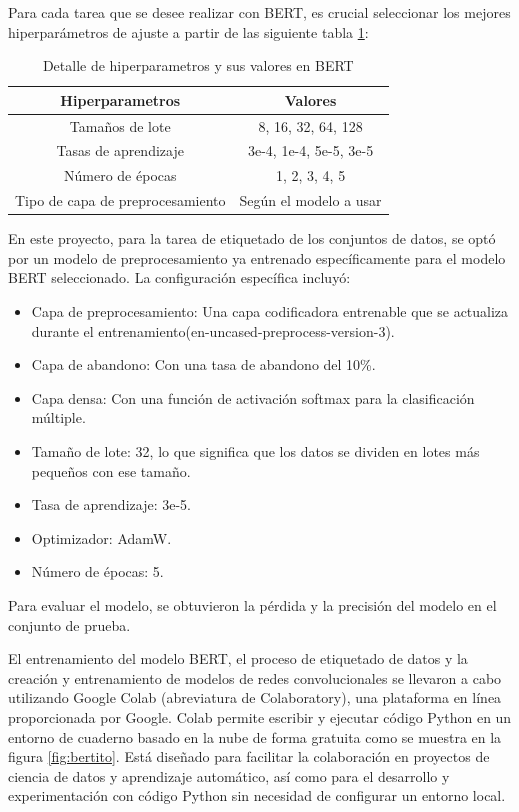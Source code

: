 Para cada tarea que se desee realizar con BERT, es crucial seleccionar los mejores hiperparámetros de ajuste a partir de las siguiente tabla \ref{tbl:2}:

\begin{table}[!ht]
	\centering
	\begin{tabular}{|c|c|}
		\hline
		\textbf{Hiperparametros} & \textbf{Valores} \\ \hline
		Tamaños de lote & 8, 16, 32, 64, 128 \\ \hline
		Tasas de aprendizaje & 3e-4, 1e-4, 5e-5, 3e-5 \\ \hline
		Número de épocas &  1, 2, 3, 4, 5 \\ \hline
		Tipo de capa de preprocesamiento & Según el modelo a usar \\ \hline
	\end{tabular}
	\caption{Detalle de hiperparametros y sus valores en BERT}
	\label{tbl:2}
\end{table}

En este proyecto, para la tarea de etiquetado de los conjuntos de datos, se optó por un modelo de preprocesamiento ya entrenado específicamente para el modelo BERT seleccionado. La configuración específica incluyó:

\begin{itemize}

\item Capa de preprocesamiento: Una capa codificadora entrenable que se actualiza durante el entrenamiento(en-uncased-preprocess-version-3).
\item Capa de abandono: Con una tasa de abandono del 10\%.
\item Capa densa: Con una función de activación softmax para la clasificación múltiple.
\item Tamaño de lote: 32, lo que significa que los datos se dividen en lotes más pequeños con ese tamaño.
\item Tasa de aprendizaje: 3e-5.
\item Optimizador: AdamW.
\item Número de épocas: 5.

\end{itemize}

Para evaluar el modelo, se obtuvieron la pérdida y la precisión del modelo en el conjunto de prueba.

El entrenamiento del modelo BERT, el proceso de etiquetado de datos y la creación y entrenamiento de modelos de redes convolucionales se llevaron a cabo utilizando Google Colab (abreviatura de Colaboratory), una plataforma en línea proporcionada por Google. Colab permite escribir y ejecutar código Python en un entorno de cuaderno basado en la nube de forma gratuita como se muestra en la figura \ref{fig:bertito}. Está diseñado para facilitar la colaboración en proyectos de ciencia de datos y aprendizaje automático, así como para el desarrollo y experimentación con código Python sin necesidad de configurar un entorno local.

